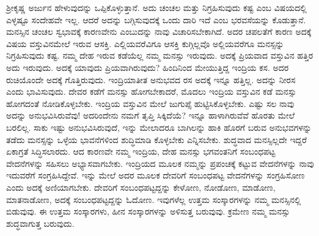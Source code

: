 ಶ‍್ರೀಕೃಷ್ಣ ಅರ್ಜುನ ಹೇಳುವುದನ್ನು ಒಪ್ಪಿಕೊಳ್ಳುತ್ತಾನೆ. ಅದು ಚಂಚಲ ಮತ್ತು ನಿಗ್ರಹಿಸುವುದು ಕಷ್ಟ ಎಂಬ ವಿಷಯದಲ್ಲಿ ಎಳ್ಳಷ್ಟೂ ಸಂದೇಹವೇ ಇಲ್ಲ. ಆದರೆ ಅದನ್ನು ಬಗ್ಗಿಸುವುದಕ್ಕೆ ಒಂದು ದಾರಿ ಇದೆ ಎಂಬ ಭರವಸೆಯನ್ನು ಕೊಡುತ್ತಾನೆ. ಮನಸ್ಸಿನ ಚಂಚಲ ಸ್ವಭಾವಕ್ಕೆ ಕಾರಣವೇನು ಎಂಬುದನ್ನು ನಾವು ವಿಚಾರಿಸಬೇಕಾಗಿದೆ. ಅದರ ಚಪಲತೆಗೆ ಕಾರಣ ಅದಕ್ಕೆ ವಿಷಯ ವಸ್ತುವಿನಮೇಲೆ ಇರುವ ಆಸಕ್ತಿ. ಎಲ್ಲಿಯವರೆವಿಗೂ ಆಸಕ್ತಿ ಕುಗ್ಗಿಲ್ಲವೊ ಅಲ್ಲಿಯವರೆಗೂ ಮನಸ್ಸನ್ನು ನಿಗ್ರಹಿಸುವುದು ಕಷ್ಟ. ನಮ್ಮ ದೇಹ ಇರುವ ಕಡೆಯೆಲ್ಲ ನಮ್ಮ ಮನಸ್ಸು ಇರುವುದು. ಅದಕ್ಕೆ ಪ್ರಿಯವಾದ ವಸ್ತುವಿನ ಹತ್ತಿರ ಅದು ಇರುವುದು. ಅದಕ್ಕೆ ಯಾವುದು ಪ್ರಿಯವಾಗಿರುವುದು? ಹಿಂದಿನಿಂದ ಮೇಯುತ್ತಿದ್ದ ಇಂದ್ರಿಯ ಕಸ. ಅದರ ರುಚಿಯೊಂದೇ ಅದಕ್ಕೆ ಗೊತ್ತಿರುವುದು. ಇಂದ್ರಿಯಾತೀತ ಅನುಭವದ ರಸ ಅದಕ್ಕೆ ಇನ್ನೂ ಹತ್ತಿಲ್ಲ. ಅದನ್ನು ನೀರಸ ಎಂದು ಭಾವಿಸುವುದು. ದೇವರ ಕಡೆಗೆ ಮನಸ್ಸು ಹೋಗಬೇಕಾದರೆ, ಮೊದಲು ಇಂದ್ರಿಯ ವಸ್ತುವಿನ ಕಡೆ ಮನಸ್ಸು ಹೋಗದಂತೆ ನೋಡಿಕೊಳ್ಳಬೇಕು. ಇಂದ್ರಿಯ ವಸ್ತುವಿನ ಮೇಲೆ ಜುಗುಪ್ಸೆ ಹುಟ್ಟಿಸಿಕೊಳ್ಳಬೇಕು. ಎಷ್ಟು ಸಲ ನಾವು ಅದನ್ನು ಅನುಭವಿಸಿರುವೆವು! ಅದರಿಂದೇನು ನಮಗೆ ತೃಪ್ತಿ ಸಿಕ್ಕಿದೆಯೆ? ಇನ್ನೂ ಹಾಳಾಗಿರುವೆವೆ ಹೊರತು ಮೇಲೆ ಬರಲಿಲ್ಲ. ಸಾಕು ಇಷ್ಟು ಅನುಭವಿಸಿರುವುದೆ, ಇನ್ನು ಮೇಲಾದರೂ ಬಾಗಿಲನ್ನು ಹಾಕಿ ಹೊರಗೆ ಬರುವ ಅನುಭವಗಳನ್ನು ತಡೆದು ಮನಸ್ಸನ್ನು ಒಳ್ಳೆಯ ಭಾವನೆಗಳಿಂದ ಶುದ್ಧಿಮಾಡಿ ಕೊಳ್ಳಬೇಕು ಎನ್ನಿಸಬೇಕು. ಶುದ್ಧವಾದ ಮನಸ್ಸಿಲ್ಲದೇ ಇದ್ದರೆ ಏಕಾಗ್ರತೆ ಸಿದ್ಧಿಸಲಾರದು. ಆದ ಕಾರಣವೇ ನಮ್ಮ ಇಂದ್ರಿಯ, ದೇಹ ಮನಸ್ಸು ಭಗವಂತನಿಗೆ ಸಂಬಂಧಪಟ್ಟ ವೇದನೆಗಳನ್ನು ಸಹಿಸಲು ಅಭ್ಯಾಸವಾಗಬೇಕು. ಇಂದ್ರಿಯದ ಮೂಲಕ ನಮ್ಮನ್ನು ಪ್ರಪಂಚಕ್ಕೆ ಕಟ್ಟುವ ವೇದನೆಗಳನ್ನು ನಾವು ಇದುವರೆಗೆ ಸಂಗ್ರಹಿಸಿದ್ದೇವೆ. ಇನ್ನು ಮೇಲೆ ಅದರ ಮೂಲಕ ದೇವರಿಗೆ ಸಂಬಂಧಪಟ್ಟ ವೇದನೆಗಳನ್ನು ಸಂಗ್ರಹಿಸೋಣ ಎಂದು ಅದಕ್ಕೆ ಅಣಿಯಾಗಬೇಕು. ದೇವರಿಗೆ ಸಂಬಂಧಪಟ್ಟದ್ದನ್ನು ಕೇಳೋಣ, ನೋಡೋಣ, ಮಾಡೋಣ, ಮಾತನಾಡೋಣ, ಅದಕ್ಕೆ ಸಂಬಂಧಪಟ್ಟದ್ದನ್ನು ಓದೋಣ. ಇವುಗಳೆಲ್ಲ ಉತ್ತಮ ಸಂಸ್ಕಾರಗಳನ್ನು ನಮ್ಮ ಮನಸ್ಸಿನಲ್ಲಿ ಬಿಡುವುವು. ಈ ಉತ್ತಮ ಸಂಸ್ಕಾರಗಳು, ಹೀನ ಸಂಸ್ಕಾರಗಳನ್ನು ಅಳಿಸುತ್ತ ಬರುವುವು. ಕ್ರಮೇಣ ನಮ್ಮ ಮನಸ್ಸು ಶುದ್ಧವಾಗುತ್ತ ಬರುವುದು.

